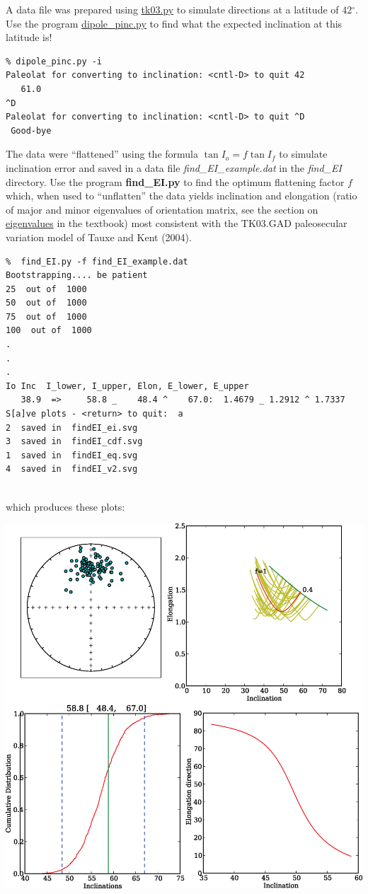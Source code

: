 \documentclass[11pt]{book}
\begin{document}
{{{A data file was prepared using \href{#tk03}{tk03.py} to simulate directions at a latitude of 42$^{\circ}$.   Use the program \href{#dipole_pinc.py}{dipole\_pinc.py} to find what the expected inclination at this latitude is!    

\begin{verbatim}
% dipole_pinc.py -i
Paleolat for converting to inclination: <cntl-D> to quit 42
   61.0
^D
Paleolat for converting to inclination: <cntl-D> to quit ^D
 Good-bye 
\end{verbatim}


The data were ``flattened'' using the formula $ \tan I_o = f \tan I_f$ to simulate inclination error and saved in a data file {\it find\_EI\_example.dat} in the {\it find\_EI} directory.    
Use the program {\bf find\_EI.py} to find the optimum flattening factor $f$ which, when used to ``unflatten'' the data  yields inclination   and  elongation (ratio of major and minor eigenvalues of orientation matrix, see the section on  \href{Webbook2.html#orientation_tensor}{eigenvalues} in the textbook)  most consistent with the TK03.GAD paleosecular variation model of Tauxe and Kent (2004). \nocite{tauxe04d}     


\begin{verbatim}
%  find_EI.py -f find_EI_example.dat
Bootstrapping.... be patient
25  out of  1000
50  out of  1000
75  out of  1000
100  out of  1000
.
.
.
Io Inc  I_lower, I_upper, Elon, E_lower, E_upper
   38.9  =>     58.8 _    48.4 ^    67.0:  1.4679 _ 1.2912 ^ 1.7337
S[a]ve plots - <return> to quit:  a
2  saved in  findEI_ei.svg
3  saved in  findEI_cdf.svg
1  saved in  findEI_eq.svg
4  saved in  findEI_v2.svg


\end{verbatim}

\noindent which produces these plots:



\includegraphics[width=15cm]{EPSfiles/find_EI.eps}

}}}
\end{document}
